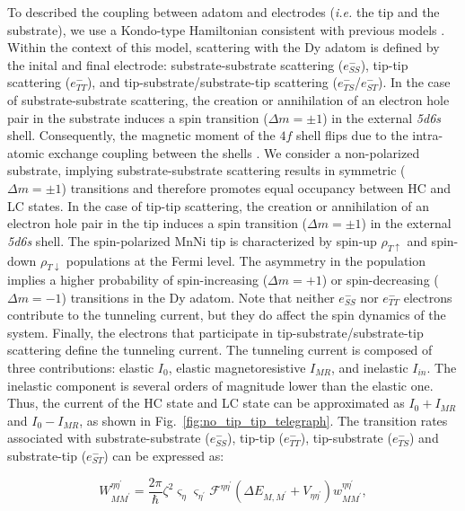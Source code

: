 \documentclass[
reprint,amsmath,amssymb,aps]{revtex4-2}
\begin{document}
To described the coupling between adatom and electrodes (\textit{i.e.} the tip and the substrate), we use a Kondo-type Hamiltonian consistent with previous models \cite{anderson1966,schrieffer1966,appelbaum1967,delgado2010,loth2010,Ternes2015}. Within the context of this model, scattering with the Dy adatom is defined by the inital and final electrode: substrate-substrate scattering ($e^{-}_{SS}$), tip-tip scattering ($e^{-}_{TT}$), and tip-substrate/substrate-tip scattering ($e^{-}_{TS}$/$e^{-}_{ST}$). In the case of substrate-substrate scattering, the creation or annihilation of an electron hole pair in the substrate induces a spin transition ($\Delta m=\pm 1$) in the external \textit{5d6s} shell. Consequently, the magnetic moment of the $4f$ shell flips due to the intra-atomic exchange coupling between the shells \cite{pivettaMeasuringIntraAtomicExchange2020}. We consider a non-polarized substrate, implying substrate-substrate scattering results in symmetric ($\Delta m=\pm 1$) transitions and therefore promotes equal occupancy between HC and LC states. In the case of tip-tip scattering, the creation or annihilation of an electron hole pair in the tip induces a spin transition ($\Delta m=\pm 1$) in the external \textit{5d6s} shell. The spin-polarized MnNi tip is characterized by spin-up $\rho_{T\uparrow}$ and spin-down $\rho_{T\downarrow}$ populations at the Fermi level. The asymmetry in the population implies a higher probability of spin-increasing ($\Delta m=+1$) or spin-decreasing ($\Delta m=-1$) transitions in the Dy adatom. Note that neither $e^{-}_{SS}$ nor $e^{-}_{TT}$ electrons contribute to the tunneling current, but they do affect the spin dynamics of the system. Finally, the electrons that participate in tip-substrate/substrate-tip scattering define the tunneling current. The tunneling current is composed of three contributions: elastic $I_0$, elastic magnetoresistive $I_{MR}$, and inelastic $I_{in}$. The inelastic component is several orders of magnitude lower than the elastic one. Thus, the current of the HC state and LC state can be approximated as $I_0+I_{MR}$ and $I_0-I_{MR}$, as shown in Fig.~\ref{fig:no_tip_tip_telegraph}. The transition rates associated with substrate-substrate ($e^{-}_{SS}$), tip-tip ($e^{-}_{TT}$), tip-substrate ($e^{-}_{TS}$) and substrate-tip ($e^{-}_{ST}$) can be expressed as:

\begin{equation}
    W_{MM^{\prime}}^{\eta \eta^{\prime}}=\dfrac{2\pi}{\hbar} \zeta^2 \varsigma_{\eta} \varsigma_{\eta^{\prime}} \mathcal{F}^{\eta\eta^{\prime}}(\Delta E_{M,M^{\prime}}+V_{\eta \eta^{\prime}} )  w_{MM^{\prime}}^{\eta \eta^{\prime}},
    \label{eq:elec_rates}
\end{equation}
\end{document}
